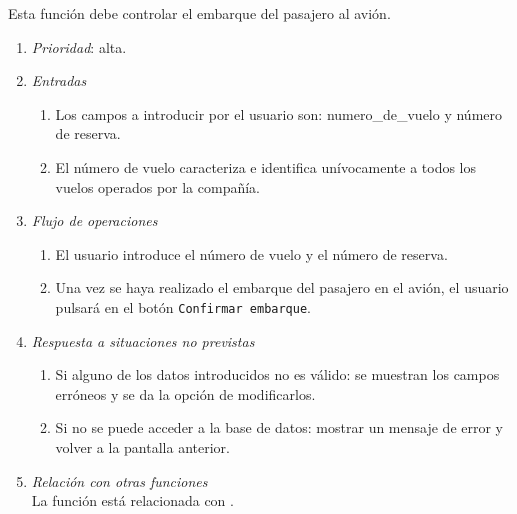  \label{fun:efectuarembarque}
	Esta función debe controlar el embarque del pasajero al avión.

	\begin{enumerate}
		\item \textit{Prioridad}: alta.
		\item \textit{Entradas}
			\begin{enumerate}
				\item Los campos a introducir por el usuario son: \gls{numero_de_vuelo} y número de reserva.
				\item El número de vuelo caracteriza e identifica unívocamente a todos los vuelos operados por la compañía.
			\end{enumerate}
		\item \textit{Flujo de operaciones}
			\begin{enumerate}
				\item El usuario introduce el número de vuelo y el número de reserva.
				\item Una vez se haya realizado el embarque del pasajero en el avión, el usuario pulsará en el botón \verb|Confirmar embarque|.
			\end{enumerate}
		\item \textit{Respuesta a situaciones no previstas}
			\begin{enumerate}
				\item Si alguno de los datos introducidos no es válido: se muestran los campos erróneos y se da la opción de modificarlos.
				\item Si no se puede acceder a la base de datos: mostrar un mensaje de error y volver a la pantalla anterior.
			\end{enumerate}
		\item \textit{Relación con otras funciones}\\
		La función está relacionada con .				
	\end{enumerate}
								
